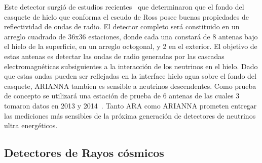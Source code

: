 \begin{description}
	 Este detector surgi\'o de estudios recientes~\cite{cite:ARIANNA2} que determinaron que el fondo del casquete de hielo que conforma el escudo de Ross posee buenas propiedades de reflectividad de ondas de radio.
	 El detector completo ser\'a constituido en un arreglo cuadrado de 36x36 estaciones, donde cada una constar\'a de 8 antenas bajo el hielo de la superficie, en un arreglo octogonal, y 2 en el exterior.
	 El objetivo de estas antenas es detectar las ondas de radio generadas por las cascadas electromagn\'eticas subsiguientes a la interacci\'on de los neutrinos en el hielo. Dado que estas ondas pueden ser reflejadas en la interface hielo agua sobre el fondo del casquete, ARIANNA tambien es sensible a neutrinos descendentes.
	 Como prueba de concepto se utilizar\'a una estaci\'on de prueba de 6 antenas de las cuales 3 tomaron datos en 2013 y 2014~\cite{cite:ARIANNA3}.
	 Tanto ARA como ARIANNA prometen entregar las mediciones m\'as sensibles de la pr\'oxima generaci\'on de detectores de neutrinos ultra energ\'eticos.
	\end{description}

	
	\subsection{Detectores de Rayos c\'osmicos}
	
	
	
	

